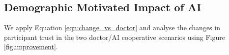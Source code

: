 \documentclass[manuscript,screen,review]{acmart}
\begin{document}












\subsection{Demographic Motivated Impact of AI}











We apply Equation \ref{eqn:change_vs_doctor} and analyse the changes in participant trust in the two doctor/AI cooperative scenarios using Figure \ref{fig:improvement}.
\end{document}
